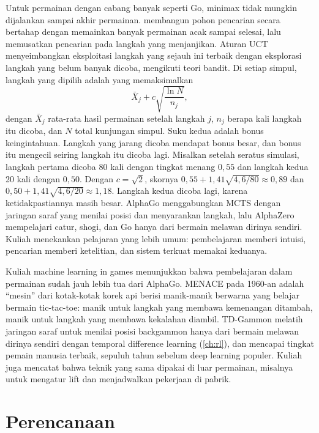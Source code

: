 Untuk permainan dengan cabang banyak seperti Go, minimax tidak mungkin dijalankan sampai
akhir permainan.  membangun pohon pencarian secara bertahap dengan
memainkan banyak permainan acak sampai selesai, lalu memusatkan pencarian pada langkah yang
menjanjikan. Aturan UCT \citep{kocsis2006} menyeimbangkan eksploitasi langkah yang sejauh ini
terbaik dengan eksplorasi langkah yang belum banyak dicoba, mengikuti teori bandit. Di setiap simpul, langkah yang dipilih adalah yang memaksimalkan
\begin{equation}
\bar X_j+c\sqrt{\frac{\ln N}{n_j}},
\end{equation}
dengan $\bar X_j$ rata-rata hasil permainan setelah langkah $j$, $n_j$ berapa kali langkah itu dicoba, dan $N$ total
kunjungan simpul. Suku kedua adalah bonus keingintahuan. Langkah yang jarang dicoba mendapat bonus besar, dan bonus itu
mengecil seiring langkah itu dicoba lagi. Misalkan setelah seratus simulasi, langkah pertama dicoba 80 kali dengan
tingkat menang $0{,}55$ dan langkah kedua 20 kali dengan $0{,}50$. Dengan $c=\sqrt2$, skornya $0{,}55+1{,}41\sqrt{4{,}6/80}\approx0{,}89$
dan $0{,}50+1{,}41\sqrt{4{,}6/20}\approx1{,}18$. Langkah kedua dicoba lagi, karena ketidakpastiannya masih besar. AlphaGo
\citep{silver2016} menggabungkan MCTS dengan jaringan saraf yang menilai posisi dan menyarankan
langkah, lalu AlphaZero \citep{silver2018} mempelajari catur, shogi, dan Go hanya dari bermain
melawan dirinya sendiri. Kuliah menekankan pelajaran yang lebih umum: pembelajaran memberi
intuisi, pencarian memberi ketelitian, dan sistem terkuat memakai keduanya.

Kuliah machine learning in games menunjukkan bahwa pembelajaran dalam permainan sudah jauh lebih tua dari AlphaGo.
MENACE pada 1960-an adalah ``mesin'' dari kotak-kotak korek api berisi manik-manik berwarna yang belajar bermain
tic-tac-toe: manik untuk langkah yang membawa kemenangan ditambah, manik untuk langkah yang membawa kekalahan diambil.
TD-Gammon \citep{tesauro1995} melatih jaringan saraf untuk menilai posisi backgammon hanya dari bermain melawan dirinya
sendiri dengan temporal difference learning (\cref{ch:rl}), dan mencapai tingkat pemain manusia terbaik, sepuluh tahun
sebelum deep learning populer. Kuliah juga mencatat bahwa teknik yang sama dipakai di luar permainan, misalnya untuk
mengatur lift dan menjadwalkan pekerjaan di pabrik.

\section{Perencanaan}

